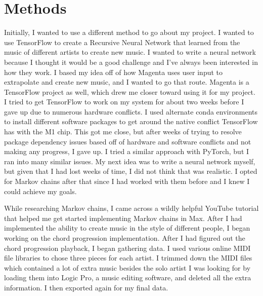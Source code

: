 \documentclass[10pt,twocolumn]{article}
\begin{document}
\section{Methods}
    Initially, I wanted to use a different method to go about my project. I wanted to use TensorFlow to create a Recursive Neural Network that learned from the music of different artists to create new music. I wanted to write a neural network because I thought it would be a good challenge and I've always been interested in how they work. I based my idea off of how Magenta\cite{Magenta} uses user input to extrapolate and create new music, and I wanted to go that route. Magenta is a TensorFlow project as well, which drew me closer toward using it for my project. I tried to get TensorFlow to work on my system for about two weeks before I gave up due to numerous hardware conflicts. I used alternate conda environments to install different software packages to get around the native conflict TensorFlow has with the M1 chip. This got me close, but after weeks of trying to resolve package dependency issues based off of hardware and software conflicts and not making any progress, I gave up. I tried a similar approach with PyTorch, but I ran into many similar issues. My next idea was to write a neural network myself, but given that I had lost weeks of time, I did not think that was realistic. I opted for Markov chains after that since I had worked with them before and I knew I could achieve my goals.\newline

    While researching Markov chains, I came across a wildly helpful YouTube tutorial that helped me get started implementing Markov chains in Max\cite{Vid1}\cite{Vid2}\cite{Vid3}. After I had implemented the ability to create music in the style of different people, I began working on the chord progression implementation. After I had figured out the chord progression playback, I began gathering data. I used various online MIDI file libraries\cite{Kaggle}\cite{BushGrafts}\cite{FreeMidi} to chose three pieces for each artist. I trimmed down the MIDI files which contained a lot of extra music besides the solo artist I was looking for by loading them into Logic Pro, a music editing software, and deleted all the extra information. I then exported again for my final data.\newline
    
\end{document}

